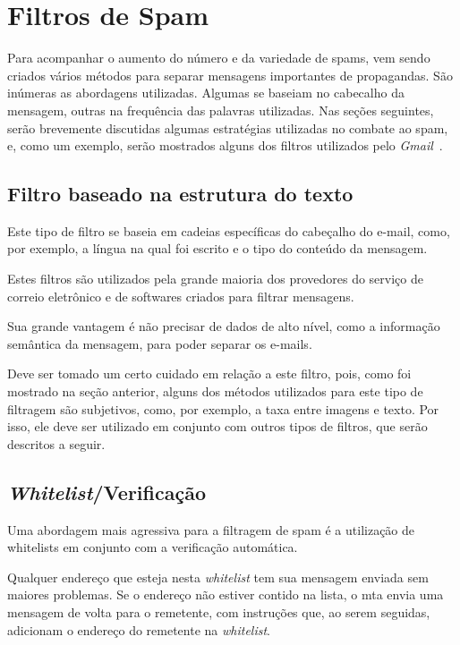 \documentclass[a4paper,dvipdfm]{article}
\begin{document}
\newpage

\section{Filtros de Spam}
	Para acompanhar o aumento do número e da variedade de spams, vem sendo criados vários métodos para separar mensagens importantes de propagandas.
	São inúmeras as abordagens utilizadas. 
	Algumas se baseiam no \gls{cabecalho} da mensagem, outras na frequência das palavras utilizadas.
	Nas seções seguintes, serão brevemente discutidas algumas estratégias utilizadas no combate ao spam, e, como um exemplo, serão mostrados alguns dos filtros utilizados pelo \emph{Gmail}~\cite{filtros, gmail:youtube, gmail:fightspam}.

	\subsection{Filtro baseado na estrutura do texto}
		Este tipo de filtro se baseia em cadeias específicas do cabeçalho do e-mail, como, por exemplo, a língua na qual foi escrito e o tipo do conteúdo da mensagem.

		Estes filtros são utilizados pela grande maioria dos provedores do serviço de correio eletrônico e de softwares criados para filtrar mensagens.

		Sua grande vantagem é não precisar de dados de alto nível, como a informação semântica da mensagem, para poder separar os e-mails.

		Deve ser tomado um certo cuidado em relação a este filtro, pois, como foi mostrado na seção anterior, alguns dos métodos utilizados para este tipo de filtragem são subjetivos, como, por exemplo, a taxa entre imagens e texto.
		Por isso, ele deve ser utilizado em conjunto com outros tipos de filtros, que serão descritos a seguir.


	\subsection{\emph{Whitelist}/Verificação}
		Uma abordagem mais agressiva para a filtragem de spam é a utilização de \glspl{whitelist} em conjunto com a verificação automática.

		Qualquer endereço que esteja nesta \emph{whitelist} tem sua mensagem enviada sem maiores problemas.
		Se o endereço não estiver contido na lista, o \gls{mta} envia uma mensagem de volta para o remetente, com instruções que, ao serem seguidas, adicionam o endereço do remetente na \emph{whitelist}.
\end{document}
